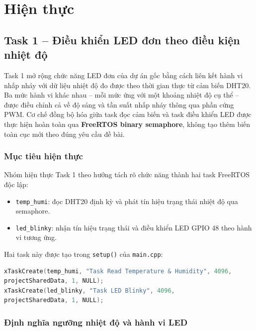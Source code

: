 ﻿\newpage

\section{Hiện thực}

\subsection{Task 1 -- Điều khiển LED đơn theo điều kiện nhiệt độ}

Task 1 mở rộng chức năng LED đơn của dự án gốc bằng cách liên kết hành vi nhấp nháy với dữ liệu nhiệt độ đo được theo thời gian thực từ cảm biến DHT20. Ba mức hành vi khác nhau -- mỗi mức ứng với một khoảng nhiệt độ cụ thể -- được điều chỉnh cả về độ sáng và tần suất nhấp nháy thông qua phần cứng PWM. Cơ chế đồng bộ hóa giữa task đọc cảm biến và task điều khiển LED được thực hiện hoàn toàn qua \textbf{FreeRTOS binary semaphore}, không tạo thêm biến toàn cục mới theo đúng yêu cầu đề bài.

\subsubsection*{Mục tiêu hiện thực}

Nhóm hiện thực Task 1 theo hướng tách rõ chức năng thành hai task FreeRTOS độc lập:
\begin{itemize}
    \item \texttt{temp\_humi}: đọc DHT20 định kỳ và phát tín hiệu trạng thái nhiệt độ qua semaphore.
    \item \texttt{led\_blinky}: nhận tín hiệu trạng thái và điều khiển LED GPIO 48 theo hành vi tương ứng.
\end{itemize}

Hai task này được tạo trong \texttt{setup()} của \texttt{main.cpp}:
\begin{lstlisting}[language=c, caption=Khởi tạo các task liên quan Task 1 trong main.cpp]
xTaskCreate(temp_humi, "Task Read Temperature & Humidity", 4096, 
projectSharedData, 1, NULL);
xTaskCreate(led_blinky, "Task LED Blinky", 4096, 
projectSharedData, 1, NULL);
\end{lstlisting}

\subsubsection*{Định nghĩa ngưỡng nhiệt độ và hành vi LED}

